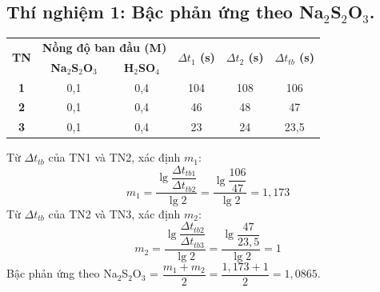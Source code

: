 \documentclass[12pt,a4paper]{report}
\begin{document}
\subsection*{Thí nghiệm 1: Bậc phản ứng theo Na$_2$S$_2$O$_3$.}
\begin{table}[h!]
    \centering
    \begin{tabular}{|c|cc|c|c|c|}
    \hline
    \multirow{2}{*}{\textbf{TN}} & \multicolumn{2}{c|}{\textbf{Nồng độ ban đầu (M)}}                     & \multirow{2}{*}{\textbf{$\Delta t_1$ (s)}} & \multirow{2}{*}{\textbf{$\Delta t_2$ (s)}} & \multirow{2}{*}{\textbf{$\Delta t_{tb}$ (s)}} \\ \cline{2-3}
                                 & \multicolumn{1}{c|}{\textbf{Na$_2$S$_2$O$_3$}} & \textbf{H$_2$SO$_4$} &                                            &                                            &                                            \\ \hline
    \textbf{1}                   & \multicolumn{1}{c|}{0,1}                       & 0,4                  & 104                                        & 108                                        & 106                                        \\ \hline
    \textbf{2}                   & \multicolumn{1}{c|}{0,1}                       & 0,4                  & 46                                         & 48                                         & 47                                        \\ \hline
    \textbf{3}                   & \multicolumn{1}{c|}{0,1}                       & 0,4                  & 23                                         & 24                                         & 23,5                                       \\ \hline
    \end{tabular}
    \end{table}
\noindent Từ $\Delta t_{tb}$ của TN1 và TN2, xác định $m_1$:
\[
    m_1 = \frac{\lg \dfrac{\Delta t_{tb1}}{\Delta t_{tb2}}}{\lg2} = \frac{\lg \dfrac{106}{47}}{\lg2} = 1,173
\]
Từ $\Delta t_{tb}$ của TN2 và TN3, xác định $m_2$:
\[
    m_2 = \frac{\lg \dfrac{\Delta t_{tb2}}{\Delta t_{tb3}}}{\lg2} = \frac{\lg \dfrac{47}{23,5}}{\lg2} = 1
\]
Bậc phản ứng theo Na$_2$S$_2$O$_3$ = $\dfrac{m_1 + m_2}{2} = \dfrac{1,173 + 1}{2} = 1,0865$.
\end{document}
